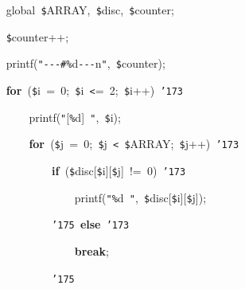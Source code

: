 \documentclass[a4paper,10pt]{article}
\def\mc{\relax}
\begin{document}
\noindent
\mbox{}{\tt\mc \ }{\tt\mc \ }{\tt\mc \ }{\tt\mc \ }global{\tt\mc \ }{\tt\$}ARRAY,{\tt\mc \ }{\tt\$}disc,{\tt\mc \ }{\tt\$}counter;

\noindent
\mbox{}{\tt\mc \ }{\tt\mc \ }{\tt\mc \ }{\tt\mc \ }{\tt\$}counter++;

\noindent
\mbox{}{\tt\mc \ }{\tt\mc \ }{\tt\mc \ }{\tt\mc \ }printf({\tt "}{\tt -}{\tt -}{\tt -}{\tt\#}{\tt\%}d{\tt -}{\tt -}{\tt -}{\tt{}}n{\tt "},{\tt\mc \ }{\tt\$}counter);

\noindent
\mbox{}{\tt\mc \ }{\tt\mc \ }{\tt\mc \ }{\tt\mc \ }\textbf{for}{\tt\mc \ }({\tt\$}i{\tt\mc \ }={\tt\mc \ }0;{\tt\mc \ }{\tt\$}i{\tt\mc \ }{\tt <}={\tt\mc \ }2;{\tt\mc \ }{\tt\$}i++){\tt\mc \ }{\tt\char'173}

\noindent
\mbox{}{\tt\mc \ }{\tt\mc \ }{\tt\mc \ }{\tt\mc \ }{\tt\mc \ }{\tt\mc \ }{\tt\mc \ }{\tt\mc \ }printf({\tt "}[{\tt\%}d]{\tt\mc \ }{\tt "},{\tt\mc \ }{\tt\$}i);

\noindent
\mbox{}{\tt\mc \ }{\tt\mc \ }{\tt\mc \ }{\tt\mc \ }{\tt\mc \ }{\tt\mc \ }{\tt\mc \ }{\tt\mc \ }\textbf{for}{\tt\mc \ }({\tt\$}j{\tt\mc \ }={\tt\mc \ }0;{\tt\mc \ }{\tt\$}j{\tt\mc \ }{\tt <}{\tt\mc \ }{\tt\$}ARRAY;{\tt\mc \ }{\tt\$}j++){\tt\mc \ }{\tt\char'173}

\noindent
\mbox{}{\tt\mc \ }{\tt\mc \ }{\tt\mc \ }{\tt\mc \ }{\tt\mc \ }{\tt\mc \ }{\tt\mc \ }{\tt\mc \ }{\tt\mc \ }{\tt\mc \ }{\tt\mc \ }{\tt\mc \ }\textbf{if}{\tt\mc \ }({\tt\$}disc[{\tt\$}i][{\tt\$}j]{\tt\mc \ }!={\tt\mc \ }0){\tt\mc \ }{\tt\char'173}

\noindent
\mbox{}{\tt\mc \ }{\tt\mc \ }{\tt\mc \ }{\tt\mc \ }{\tt\mc \ }{\tt\mc \ }{\tt\mc \ }{\tt\mc \ }{\tt\mc \ }{\tt\mc \ }{\tt\mc \ }{\tt\mc \ }{\tt\mc \ }{\tt\mc \ }{\tt\mc \ }{\tt\mc \ }printf({\tt "}{\tt\%}d{\tt\mc \ }{\tt "},{\tt\mc \ }{\tt\$}disc[{\tt\$}i][{\tt\$}j]);

\noindent
\mbox{}{\tt\mc \ }{\tt\mc \ }{\tt\mc \ }{\tt\mc \ }{\tt\mc \ }{\tt\mc \ }{\tt\mc \ }{\tt\mc \ }{\tt\mc \ }{\tt\mc \ }{\tt\mc \ }{\tt\mc \ }{\tt\char'175}{\tt\mc \ }\textbf{else}{\tt\mc \ }{\tt\char'173}

\noindent
\mbox{}{\tt\mc \ }{\tt\mc \ }{\tt\mc \ }{\tt\mc \ }{\tt\mc \ }{\tt\mc \ }{\tt\mc \ }{\tt\mc \ }{\tt\mc \ }{\tt\mc \ }{\tt\mc \ }{\tt\mc \ }{\tt\mc \ }{\tt\mc \ }{\tt\mc \ }{\tt\mc \ }\textbf{break};

\noindent
\mbox{}{\tt\mc \ }{\tt\mc \ }{\tt\mc \ }{\tt\mc \ }{\tt\mc \ }{\tt\mc \ }{\tt\mc \ }{\tt\mc \ }{\tt\mc \ }{\tt\mc \ }{\tt\mc \ }{\tt\mc \ }{\tt\char'175}
\end{document}
